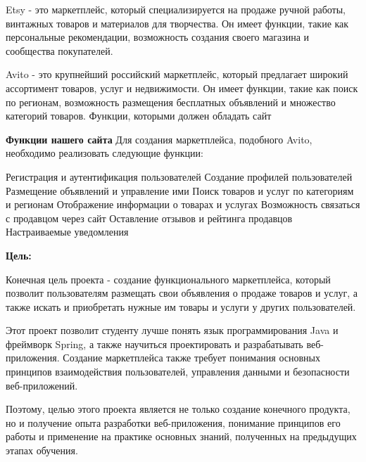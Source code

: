 Etsy - это маркетплейс, который специализируется на продаже ручной работы, винтажных товаров и материалов для творчества. Он имеет функции, такие как персональные рекомендации, возможность создания своего магазина и сообщества покупателей.

Avito - это крупнейший российский маркетплейс, который предлагает широкий ассортимент товаров, услуг и недвижимости. Он имеет функции, такие как поиск по регионам, возможность размещения бесплатных объявлений и множество категорий товаров.
Функции, которыми должен обладать сайт


\textbf{Функции нашего сайта}
Для создания маркетплейса, подобного Avito, необходимо реализовать следующие функции:

    Регистрация и аутентификация пользователей
    Создание профилей пользователей
    Размещение объявлений и управление ими
    Поиск товаров и услуг по категориям и регионам
    Отображение информации о товарах и услугах
    Возможность связаться с продавцом через сайт
    Оставление отзывов и рейтинга продавцов
    Настраиваемые уведомления



\textbf{Цель:}

Конечная цель проекта - создание функционального маркетплейса, который позволит пользователям размещать свои объявления о продаже товаров и услуг, а также искать и приобретать нужные им товары и услуги у других пользователей.

Этот проект позволит студенту лучше понять язык программирования Java и фреймворк Spring, а также научиться проектировать и разрабатывать веб-приложения. Создание маркетплейса также требует понимания основных принципов взаимодействия пользователей, управления данными и безопасности веб-приложений.

Поэтому, целью этого проекта является не только создание конечного продукта, но и получение опыта разработки веб-приложения, понимание принципов его работы и применение на практике основных знаний, полученных на предыдущих этапах обучения.










